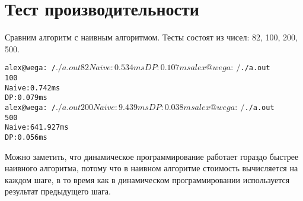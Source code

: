 \section{Тест производительности}
Сравним алгоритм с наивным алгоритмом. Тесты состоят из чисел: 82, 100, 200, 500. 

\begin{alltt}
alex@wega:~/$ ./a.out 
82
Naive: 0.534 ms
DP: 0.107 ms
alex@wega:~/$ ./a.out 
100
Naive: 0.742 ms
DP: 0.079 ms
alex@wega:~/$ ./a.out 
200
Naive: 9.439 ms
DP: 0.038 ms
alex@wega:~/$ ./a.out 
500
Naive: 641.927 ms
DP: 0.056 ms
\end{alltt}

Можно заметить, что динамическое программирование работает гораздо быстрее наивного алгоритма, потому что в наивном алгоритме 
стоимость вычисляется на каждом шаге, в то время как в динамическом программировании используется результат предыдущего шага.

\pagebreak
